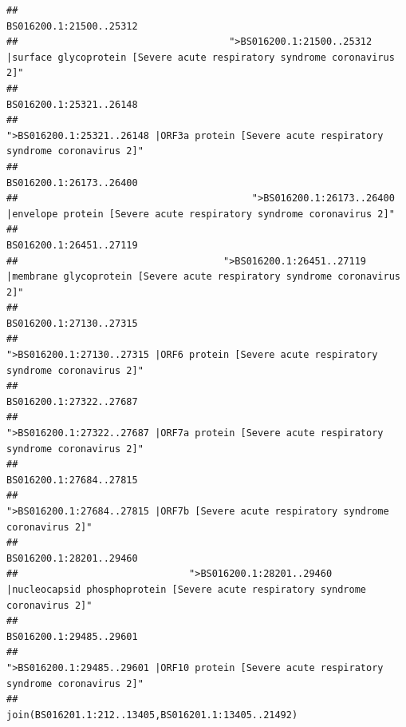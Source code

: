\documentclass[
]{article}
\begin{document}
\begin{verbatim}
##                                                                                                                BS016200.1:21500..25312 
##                                     ">BS016200.1:21500..25312 |surface glycoprotein [Severe acute respiratory syndrome coronavirus 2]" 
##                                                                                                                BS016200.1:25321..26148 
##                                            ">BS016200.1:25321..26148 |ORF3a protein [Severe acute respiratory syndrome coronavirus 2]" 
##                                                                                                                BS016200.1:26173..26400 
##                                         ">BS016200.1:26173..26400 |envelope protein [Severe acute respiratory syndrome coronavirus 2]" 
##                                                                                                                BS016200.1:26451..27119 
##                                    ">BS016200.1:26451..27119 |membrane glycoprotein [Severe acute respiratory syndrome coronavirus 2]" 
##                                                                                                                BS016200.1:27130..27315 
##                                             ">BS016200.1:27130..27315 |ORF6 protein [Severe acute respiratory syndrome coronavirus 2]" 
##                                                                                                                BS016200.1:27322..27687 
##                                            ">BS016200.1:27322..27687 |ORF7a protein [Severe acute respiratory syndrome coronavirus 2]" 
##                                                                                                                BS016200.1:27684..27815 
##                                                    ">BS016200.1:27684..27815 |ORF7b [Severe acute respiratory syndrome coronavirus 2]" 
##                                                                                                                BS016200.1:28201..29460 
##                              ">BS016200.1:28201..29460 |nucleocapsid phosphoprotein [Severe acute respiratory syndrome coronavirus 2]" 
##                                                                                                                BS016200.1:29485..29601 
##                                            ">BS016200.1:29485..29601 |ORF10 protein [Severe acute respiratory syndrome coronavirus 2]" 
##                                                                                    join(BS016201.1:212..13405,BS016201.1:13405..21492) 

\end{verbatim}
\end{document}
